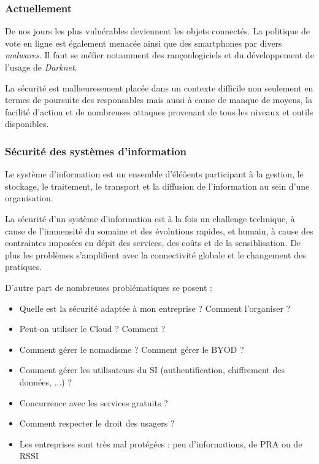 \documentclass[12pt, a4paper]{article}
\begin{document}
	\subsubsection{Actuellement}
	De nos jours les plus vulnérables deviennent les objets connectés. La
	politique de vote en ligne est également menacée ainsi que des smartphones
	par divers \textit{malwares}. Il faut se méfier notamment des rançonlogiciels
	et du développement de l'usage de \textit{Darknet}.
	\par
	La sécurité est malheuresement placée dans un contexte difficile non seulement
	 en termes de poursuite des responsables mais aussi à cause de manque de
	moyens, la facilité d'action et de nombreuses attaques provenant de tous les
	niveaux et outils disponibles.
	\subsubsection{Sécurité des systèmes d'information}
	Le système d'information est un ensemble d'éléôents participant à la gestion,
	le stockage, le traitement, le transport et la diffusion de l'information au
	sein d'une organisation.
	\par
	La sécurité d'un système d'information est à la fois un challenge technique, à
	 cause de l'immensité du somaine et des évolutions rapides, et humain, à cause
  des contraintes imposées en dépit des services, des coûts et de la
	sensiblisation. De plus les problèmes s'amplifient avec la connectivité
	globale et le changement des pratiques.
	\par
	D'autre part de nombreuses problématiques se posent :
	\begin{itemize}
		\item Quelle est la sécurité adaptée à mon entreprise ? Comment l'organiser
		?
		\item Peut-on utiliser le Cloud ? Comment ?
		\item Comment gérer le nomadisme ? Comment gérer le BYOD ?
		\item Comment gérer les utilisateurs du SI (authentification, chiffrement
		des données, ...) ?
		\item Concurrence avec les services gratuits ?
		\item Comment respecter le droit des usagers ?
		\item Les entreprises sont très mal protégées : peu d'informations, de PRA
		ou de RSSI
	\end{itemize}
\end{document}

